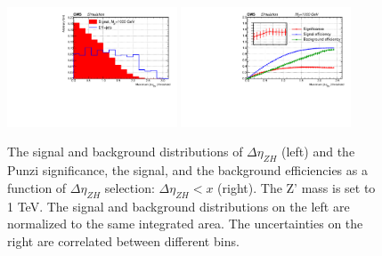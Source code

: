 \begin{figure}[htbp]
   \centering
   \includegraphics[width=0.45\textwidth]{optimization/plot_dEta/plot_dEta_input_in_Zprime_mass_1000.pdf}
   \includegraphics[width=0.45\textwidth]{optimization/plot_dEta/plot_dEta_Significance_and_efficiency_for_Zprme_M_1000.pdf}
   \caption{The signal and background distributions of $\Delta \eta_{ZH}$ 
(left) and the Punzi significance, the signal, and the background efficiencies as a 
function of $\Delta \eta_{ZH}$ 
   selection: $\Delta \eta_{ZH} < x$ (right). The Z' mass is set to 1 TeV. The 
   signal and background distributions on the left are normalized to the same 
   integrated area. The uncertainties on the right are correlated between 
 different bins.}
   \label{fig:detaone}
\end{figure}

